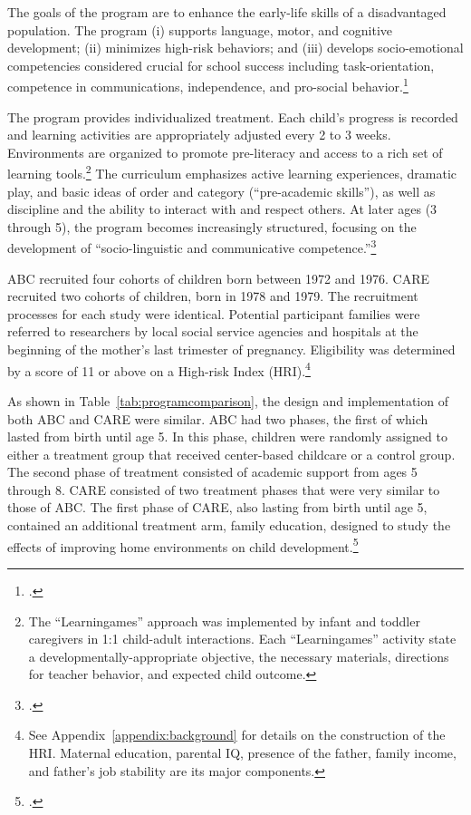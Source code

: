 The goals of the program are to enhance the early-life skills of a disadvantaged population. The program (i) supports language, motor, and cognitive development; (ii) minimizes high-risk behaviors; and (iii) develops socio-emotional competencies considered crucial for school success including task-orientation, competence in communications, independence, and pro-social behavior.\footnote{\citet{Ramey_Collier_etal_1976_CarolinaAbecedarianProject, Ramey_etal_1985_Project-CARE_TiECSE, Sparling_1974_Synth_Edu_Infant_SPEECH, Wasik_Ramey_etal_1990_CD, Ramey-etal_2012-ABC}.}

The program provides individualized treatment. Each child's progress is recorded and learning activities are appropriately adjusted every 2 to 3 weeks. Environments are organized to promote pre-literacy and access to a rich set of learning tools.\footnote{The ``Learningames'' approach was implemented by infant and toddler caregivers in 1:1 child-adult interactions. Each ``Learningames'' activity state a developmentally-appropriate objective, the necessary materials, directions for teacher behavior, and expected child outcome.} The curriculum emphasizes active learning experiences, dramatic play, and basic ideas of order and category (``pre-academic skills''), as well as discipline and the ability to interact with and respect others.  At later ages (3 through 5), the program becomes increasingly structured, focusing on the development of ``socio-linguistic and communicative competence.''\footnote{\citet{Ramey-et-al_1977_Intro-to-ABC, Haskins_1985_CD, Ramey_1981_Modification, Ramey_Campbell_1979_SR, Ramey_Smith_1977_AJMD, Ramey_McGinness_etal_1982_Abecedarianapproach, Sparling_Lewis_1979_BOOKLearninggamesFirstThree,Sparling_Lewis_1984_BOOKLearningGamesThreesFours}.}

ABC recruited four cohorts of children born between 1972 and 1976. CARE recruited two cohorts of children, born in 1978 and 1979. The recruitment processes for each study were identical. Potential participant families were referred to researchers by local social service agencies and hospitals at the beginning of the mother's last trimester of pregnancy. Eligibility was determined by a score of 11 or above on a High-risk Index (HRI).\footnote{See Appendix~\ref{appendix:background} for details on the construction of the HRI. Maternal education, parental IQ, presence of the father, family income, and father's job stability are its major components.}

As shown in Table~\ref{tab:programcomparison}, the design and implementation of both ABC and CARE were similar. ABC had two phases, the first of which lasted from birth until age 5. In this phase, children were randomly assigned to either a treatment group that received center-based childcare or a control group. The second phase of treatment consisted of academic support from ages 5 through 8. CARE consisted of two treatment phases that were very similar to those of ABC. The first phase of CARE, also lasting from birth until age 5, contained an additional treatment arm, family education, designed to study the effects of improving home environments on child development.\footnote{\citet{Wasik_Ramey_etal_1990_CD}.}

